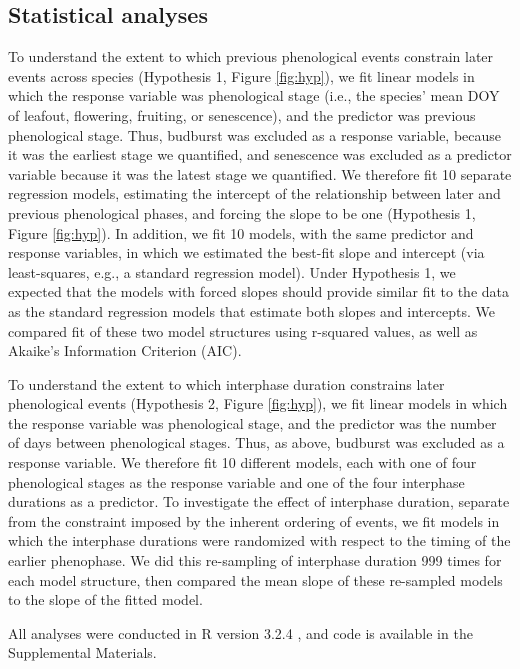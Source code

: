 \documentclass{article}
\begin{document}
\subsection*{Statistical analyses}
To understand the extent to which previous phenological events constrain later events across species (Hypothesis 1, Figure \ref{fig:hyp}), we fit linear models in which the response variable was phenological stage (i.e., the species' mean DOY of leafout, flowering, fruiting, or senescence), and the predictor was previous phenological stage. Thus, budburst was excluded as a response variable, because it was the earliest stage we quantified, and senescence was excluded as a predictor variable because it was the latest stage we quantified.  We therefore fit 10 separate regression models, estimating the intercept of the relationship between later and previous phenological phases, and forcing the slope to be one (Hypothesis 1, Figure \ref{fig:hyp}). In addition, we fit 10 models, with the same predictor and response variables, in which we estimated the best-fit slope and intercept (via least-squares, e.g., a standard regression model). Under Hypothesis 1, we expected that the models with forced slopes should provide similar fit to the data as the standard regression models that estimate both slopes and intercepts. We compared fit of these two model structures using r-squared values, as well as Akaike's Information Criterion (AIC).  
\par To understand the extent to which interphase duration constrains later phenological events (Hypothesis 2, Figure \ref{fig:hyp}), we fit linear models in which the response variable was phenological stage, and the predictor was the number of days between phenological stages. Thus, as above, budburst was excluded as a response variable. We therefore fit 10 different models, each with one of four phenological stages as the response variable and one of the four interphase durations as a predictor. To investigate the effect of interphase duration, separate from the constraint imposed by the inherent ordering of events, we fit models in which the interphase durations were randomized with respect to the timing of the earlier phenophase. We did this re-sampling of interphase duration 999 times for each model structure, then compared the mean slope of these re-sampled models to the slope of the fitted model.  %
\par All analyses were conducted in R version 3.2.4 \citep{rcoreteam2016}, and code is available in the Supplemental Materials.
\end{document}
